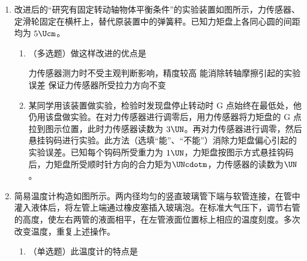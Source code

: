 \documentclass[\gkver]{gaokaozhenti}
\begin{document}
\begin{enumerate}
{（2）由（1）的计算可知欧姆表内的电池电动势变化影响测量的准确性，电池内阻变化不影响测量的准确性，所以测量结果准确。
}

\item
改进后的“研究有固定转动轴物体平衡条件”的实验装置如图所示，力传感器、定滑轮固定在横杆上，替代原装置中的弹簧秤。已知力矩盘上各同心圆的间距均为 $5\Ucm$。
\begin{enumerate}
	\item
	（多选题）做这样改进的优点是

	{力传感器测力时不受主观判断影响，精度较高}
	{能消除转轴摩擦引起的实验误差}
	{保证力传感器所受拉力方向不变}

	\item
	某同学用该装置做实验，检验时发现盘停止转动时 G 点始终在最低处，他仍用该盘做实验。在对力传感器进行调零后，用力传感器将力矩盘的 G 点拉到图示位置，此时力传感器读数为 $3\UN$。再对力传感器进行调零，然后悬挂钩码进行实验。此方法（选填“能”、“不能”）消除力矩盘偏心引起的实验误差。已知每个钩码所受重力为 $1\UN$，力矩盘按图示方式悬挂钩码后，力矩盘所受顺时针方向的合力矩为$\UNcdotm$，力传感器的读数为$\UN$。
\end{enumerate}

\onepicture[align=right, h=5.20cm]{}

\item
简易温度计构造如图所示。两内径均匀的竖直玻璃管下端与软管连接，在管中灌入液体后，将左管上端通过橡皮塞插入玻璃泡。在标准大气压下，调节右管的高度，使左右两管的液面相平，在左管液面位置标上相应的温度刻度。多次改变温度，重复上述操作。
\begin{enumerate}
	\item
	（单选题）此温度计的特点是


\end{enumerate}
\end{enumerate}
\end{document}
